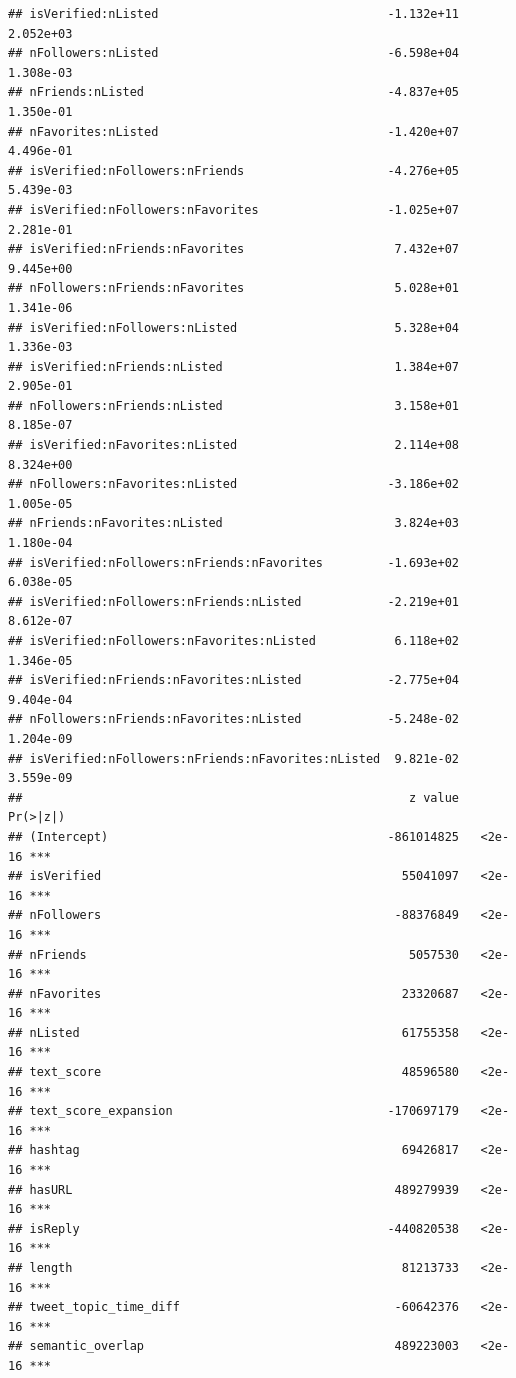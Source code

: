 \documentclass[
]{article}
\begin{document}
\begin{verbatim}
## isVerified:nListed                                -1.132e+11  2.052e+03
## nFollowers:nListed                                -6.598e+04  1.308e-03
## nFriends:nListed                                  -4.837e+05  1.350e-01
## nFavorites:nListed                                -1.420e+07  4.496e-01
## isVerified:nFollowers:nFriends                    -4.276e+05  5.439e-03
## isVerified:nFollowers:nFavorites                  -1.025e+07  2.281e-01
## isVerified:nFriends:nFavorites                     7.432e+07  9.445e+00
## nFollowers:nFriends:nFavorites                     5.028e+01  1.341e-06
## isVerified:nFollowers:nListed                      5.328e+04  1.336e-03
## isVerified:nFriends:nListed                        1.384e+07  2.905e-01
## nFollowers:nFriends:nListed                        3.158e+01  8.185e-07
## isVerified:nFavorites:nListed                      2.114e+08  8.324e+00
## nFollowers:nFavorites:nListed                     -3.186e+02  1.005e-05
## nFriends:nFavorites:nListed                        3.824e+03  1.180e-04
## isVerified:nFollowers:nFriends:nFavorites         -1.693e+02  6.038e-05
## isVerified:nFollowers:nFriends:nListed            -2.219e+01  8.612e-07
## isVerified:nFollowers:nFavorites:nListed           6.118e+02  1.346e-05
## isVerified:nFriends:nFavorites:nListed            -2.775e+04  9.404e-04
## nFollowers:nFriends:nFavorites:nListed            -5.248e-02  1.204e-09
## isVerified:nFollowers:nFriends:nFavorites:nListed  9.821e-02  3.559e-09
##                                                      z value Pr(>|z|)    
## (Intercept)                                       -861014825   <2e-16 ***
## isVerified                                          55041097   <2e-16 ***
## nFollowers                                         -88376849   <2e-16 ***
## nFriends                                             5057530   <2e-16 ***
## nFavorites                                          23320687   <2e-16 ***
## nListed                                             61755358   <2e-16 ***
## text_score                                          48596580   <2e-16 ***
## text_score_expansion                              -170697179   <2e-16 ***
## hashtag                                             69426817   <2e-16 ***
## hasURL                                             489279939   <2e-16 ***
## isReply                                           -440820538   <2e-16 ***
## length                                              81213733   <2e-16 ***
## tweet_topic_time_diff                              -60642376   <2e-16 ***
## semantic_overlap                                   489223003   <2e-16 ***

\end{verbatim}
\end{document}
